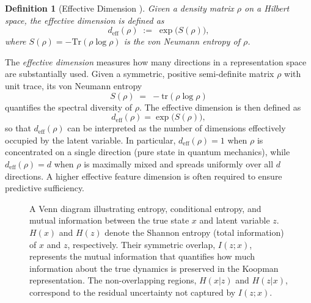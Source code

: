 \documentclass{article} %
\newtheorem{definition}[theorem]{Definition}
\begin{document}
\begin{definition}[Effective Dimension \citep{roy2007effective}] \label{definition:effective_dim}
Given a density matrix \( \rho \) on a Hilbert space, the \emph{effective dimension} is defined as
\[
d_{\mathrm{eff}}(\rho) \;:=\; \exp\!\big( S(\rho) \big),
\]
where \( S(\rho) = - \mathrm{Tr}(\rho \log \rho) \) is the von Neumann entropy of \( \rho \).
\end{definition}


The \emph{effective dimension} measures how many directions in a representation space are substantially used. 
Given a symmetric, positive semi-definite matrix \( \rho \) with unit trace, its von Neumann entropy 
\[
S(\rho) \;=\; - \mathrm{tr}(\rho \log \rho)
\]
quantifies the spectral diversity of \( \rho \). 
The effective dimension is then defined as 
\[
d_{\mathrm{eff}}(\rho) = \exp\!\big(S(\rho)\big),
\]
so that \(d_{\mathrm{eff}}(\rho)\) can be interpreted as the number of dimensions effectively occupied by the latent variable. 
In particular, \(d_{\mathrm{eff}}(\rho) = 1\) when \( \rho \) is concentrated on a single direction (pure state in quantum mechanics), while \(d_{\mathrm{eff}}(\rho) = d\) when \( \rho \) is maximally mixed and spreads uniformly over all \(d\) directions. 
A higher effective feature dimension is often required to ensure predictive sufficiency.

\begin{figure}[H]
    \centering
    \caption{A Venn diagram illustrating entropy, conditional entropy, and mutual information between the true state $x$ and latent variable $z$. $H(x)$ and $H(z)$ denote the Shannon entropy (total information) of $x$ and $z$, respectively. Their symmetric overlap, $I(z; x)$, represents the mutual information that quantifies how much information about the true dynamics is preserved in the Koopman representation. The non-overlapping regions, $H(x|z)$ and $H(z | x)$, correspond to the residual uncertainty not captured by $I(z; x)$.}
    \label{fig:mutual_info_venn}
\end{figure}
\end{document}
